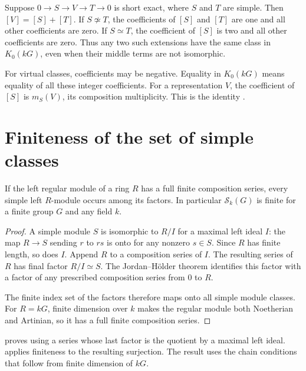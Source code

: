 \begin{example}
\label{lib:kzero:extension-example}
Suppose $0\to S\to V\to T\to0$ is short exact, where $S$ and $T$ are
simple. Then $[V]=[S]+[T]$. If $S\not\simeq T$, the coefficients of
$[S]$ and $[T]$ are one and all other coefficients are zero. If $S\simeq T$,
the coefficient of $[S]$ is two and all other coefficients are zero.
Thus any two such extensions have the same class in $K_0(kG)$, even when
their middle terms are not isomorphic.
\end{example}

For virtual classes, coefficients may be negative. Equality in $K_0(kG)$
means equality of all these integer coefficients. For a representation
$V$, the coefficient of $[S]$ is $m_S(V)$, its composition multiplicity.
This is the identity
.

\section{Finiteness of the set of simple classes}
\label{lib:kzero:simple-finite}

\begin{proposition}
\label{lib:kzero:finite-simples-theorem}
If the left regular module of a ring $R$ has a full finite composition
series, every simple left $R$-module occurs among its factors. In particular
$\mathcal S_k(G)$ is finite for a finite group $G$ and any field $k$.
\end{proposition}
\begin{proof}
A simple module $S$ is isomorphic to $R/I$ for a maximal left ideal $I$:
the map $R\to S$ sending $r$ to $rs$ is onto for any nonzero $s\in S$.
Since $R$ has finite length, so does $I$. Append $R$ to a
composition series of $I$. The resulting series of $R$ has final
factor $R/I\simeq S$. The Jordan--H\"older theorem identifies this
factor with a factor of any prescribed composition series from $0$ to $R$.

The finite index set of the factors therefore maps onto all simple module
classes. For $R=kG$, finite dimension over $k$ makes the regular module
both Noetherian and Artinian, so it has a full finite composition series.
\end{proof}

\begin{implementation}
 proves
 using a series whose
last factor is the quotient by a maximal left ideal.
 applies finiteness
to the resulting surjection. The result
 uses the chain conditions
that follow from finite dimension of $kG$.
\end{implementation}

